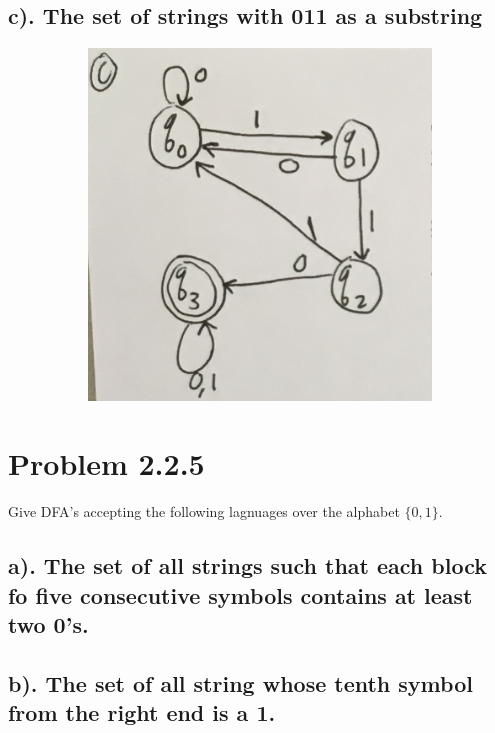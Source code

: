 \documentclass[20pt]{article} %
\begin{document}
\subsection{c). The set of strings with 011 as a substring}
\begin{figure}[!htbp]
  	\centering
   	\begin{subfigure}[p]{0.6\linewidth}
    	\includegraphics[width=\linewidth]{./figures/H1c.png}
   	\end{subfigure}
\end{figure} 
\newpage
\section{Problem 2.2.5}
Give DFA's accepting the following lagnuages over the alphabet $\{0,1\}$.
\subsection{a). The set of all strings such that each block fo five consecutive symbols contains at least two 0's.}

\subsection{b). The set of all string whose tenth symbol from the right end is a 1.}
\end{document}
